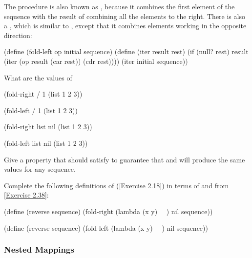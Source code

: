 \begin{exercise}
	\label{Exercise 2.38}
	The  procedure is also known as , because it combines the first element of the sequence with the result of combining all the elements to the right.
	There is also a , which is similar to , except that it combines elements working in the opposite direction:
	\begin{scheme}
	  (define (fold-left op initial sequence)
	    (define (iter result rest)
	      (if (null? rest)
	          result
	          (iter (op result (car rest))
	                (cdr rest))))
	    (iter initial sequence))
	\end{scheme}
	What are the values of
	\begin{scheme}
	  (fold-right / 1 (list 1 2 3))

	  (fold-left / 1 (list 1 2 3))

	  (fold-right list nil (list 1 2 3))

	  (fold-left list nil (list 1 2 3))
	\end{scheme}
	Give a property that  should satisfy to guarantee that  and  will produce the same values for any sequence.
\end{exercise}



\begin{exercise}
	\label{Exercise 2.39}
	Complete the following definitions of  (\cref{Exercise 2.18}) in terms of  and  from \cref{Exercise 2.38}:
	\begin{scheme}
	  (define (reverse sequence)
	    (fold-right (lambda (x y) ~~) nil sequence))

	  (define (reverse sequence)
	    (fold-left (lambda (x y) ~~) nil sequence))
	\end{scheme}
\end{exercise}



\subsubsection*{Nested Mappings}

